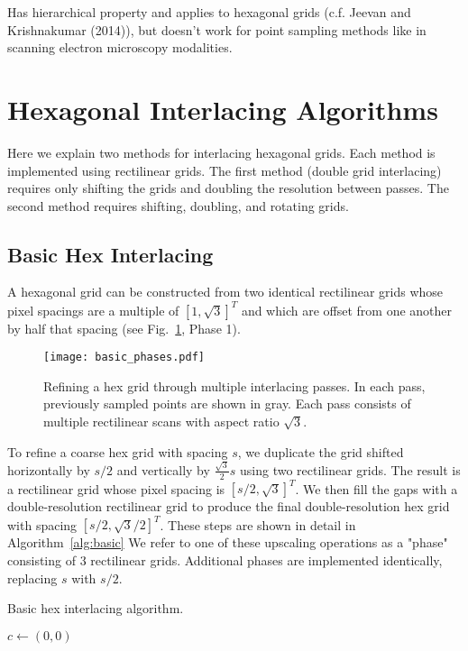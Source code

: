\documentclass{article}
\begin{document}
Has hierarchical property and applies to hexagonal grids (c.f. Jeevan
and Krishnakumar (2014)), but doesn't work for point sampling methods
like in scanning electron microscopy modalities.


\section{Hexagonal Interlacing Algorithms}
\label{sec:hexinter}

Here we explain two methods for interlacing hexagonal grids.
%
Each method is implemented using rectilinear grids.
%
The first method (double grid interlacing) requires only shifting the grids and doubling the resolution between passes.
%
The second method requires shifting, doubling, and rotating grids.


\subsection{Basic Hex Interlacing}
\label{double-grid-interlacing}

A hexagonal grid can be constructed from two identical rectilinear grids
whose pixel spacings are a multiple of $[1, \sqrt{3}]^T$ and which are offset from one another by half that spacing (see Fig.~\ref{fig:basicphases}, Phase 1).

\begin{figure}[ht]
\centering
\texttt{[image: basic\_phases.pdf]}
\caption{
\label{fig:basicphases} Refining a hex grid through multiple interlacing passes.
%
In each pass, previously sampled points are shown in gray.
%
Each pass consists of multiple rectilinear scans with aspect ratio $\sqrt{3}$.
}
\end{figure}

To refine a coarse hex grid with spacing $s$, we duplicate the grid shifted horizontally by $s/2$ and vertically by $\frac{\sqrt{3}}{2} s$ using two rectilinear grids.
%
The result is a rectilinear grid whose pixel spacing is $[s/2, \sqrt{3}]^T$.
%
We then fill the gaps with a double-resolution rectilinear grid to produce the final double-resolution hex grid with spacing $[s/2, \sqrt{3}/2]^T$.
%
These steps are shown in detail in Algorithm~\ref{alg:basic}
%
We refer to one of these upscaling operations as a "phase" consisting of 3 rectilinear grids.
%
Additional phases are implemented identically, replacing $s$ with $s/2$.

\begin{algorithm}
\caption{Basic hex interlacing algorithm.}\label{alg:basic}
\begin{algorithmic}
	\State $c \gets (0, 0)$
\end{algorithmic}
\end{algorithm}
\end{document}
